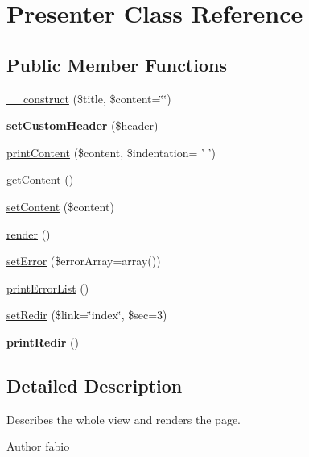 \hypertarget{classPresenter}{\section{Presenter Class Reference}
\label{classPresenter}
}
\subsection*{Public Member Functions}
\begin{DoxyCompactItemize}
\item 
\hyperlink{classPresenter_a24c04a54ce929bc12219f037a794d439}{\+\_\+\+\_\+construct} (\$title, \$content=\char`\"{}\char`\"{})
\item 
\hypertarget{classPresenter_a299e31916fc252227e369fc5efad77f9}{{\bfseries set\+Custom\+Header} (\$header)}\label{classPresenter_a299e31916fc252227e369fc5efad77f9}

\item 
\hyperlink{classPresenter_a327ab1b725813be28114753935b42cd4}{print\+Content} (\$content, \$indentation= ' ')
\item 
\hyperlink{classPresenter_a8a9d11db6633e0ebb898abd4580f8988}{get\+Content} ()
\item 
\hyperlink{classPresenter_a9a7d0d294934548d13620baca0657087}{set\+Content} (\$content)
\item 
\hyperlink{classPresenter_a2194a46cf6c23dd4e483f1ee63bc2236}{render} ()
\item 
\hyperlink{classPresenter_a1d66815ed950c7362a9c87bbcc6d9b7b}{set\+Error} (\$error\+Array=array())
\item 
\hyperlink{classPresenter_a5e4fe61038c5535719c6d7bc3b557019}{print\+Error\+List} ()
\item 
\hyperlink{classPresenter_a517ff93f6c099065a0d67c0994f0b76b}{set\+Redir} (\$link=\char`\"{}index\char`\"{}, \$sec=3)
\item 
\hypertarget{classPresenter_ace2a8a72ee53e6be953614d00e29f741}{{\bfseries print\+Redir} ()}\label{classPresenter_ace2a8a72ee53e6be953614d00e29f741}

\end{DoxyCompactItemize}


\subsection{Detailed Description}
Describes the whole view and renders the page.

\begin{DoxyAuthor}{Author}
fabio 
\end{DoxyAuthor}


